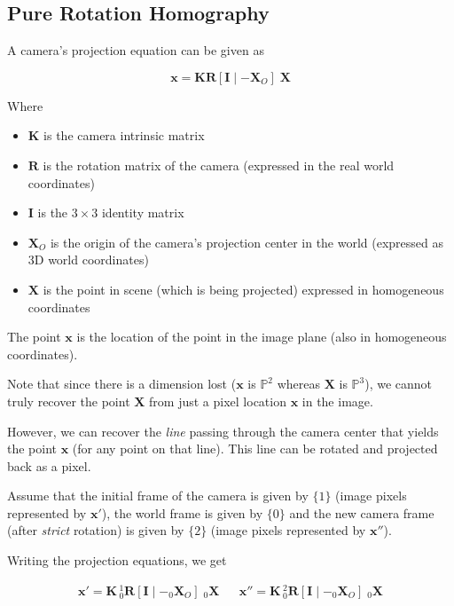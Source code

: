 
\subsection{Pure Rotation Homography}

A camera's projection equation can be given as

\begin{equation}
    \mathbf{x} = \mathbf{KR} [ \mathbf{I} \mid - \mathbf{X}_O ] \; \mathbf{X}
\end{equation}

Where

\begin{itemize}
    \item $\mathbf{K}$ is the camera intrinsic matrix
    \item $\mathbf{R}$ is the rotation matrix of the camera (expressed in the real world coordinates)
    \item $\mathbf{I}$ is the $3\times 3$ identity matrix
    \item $\mathbf{X}_O$ is the origin of the camera's projection center in the world (expressed as 3D world coordinates)
    \item $\mathbf{X}$ is the point in scene (which is being projected) expressed in homogeneous coordinates
\end{itemize}

The point $\mathbf{x}$ is the location of the point in the image plane (also in homogeneous coordinates).

Note that since there is a dimension lost ($\mathbf{x}$ is $\mathbb{P}^2$ whereas $\mathbf{X}$ is $\mathbb{P}^3$), we cannot truly recover the point $\mathbf{X}$ from just a pixel location $\mathbf{x}$ in the image. 

However, we can recover the \textit{line} passing through the camera center that yields the point $\mathbf{x}$ (for any point on that line). This line can be rotated and projected back as a pixel.

Assume that the initial frame of the camera is given by $\{1\}$ (image pixels represented by $\mathbf{x}'$), the world frame is given by $\{0\}$ and the new camera frame (after \textit{strict} rotation) is given by $\{2\}$ (image pixels represented by $\mathbf{x''}$).

Writing the projection equations, we get

\begin{align}
    \mathbf{x}' = \mathbf{K} \, ^1_0\mathbf{R} [ \mathbf{I} \mid - _0\mathbf{X}_O ] \; _0\mathbf{X}
    &&
    \mathbf{x}'' = \mathbf{K} \, ^2_0\mathbf{R} [ \mathbf{I} \mid - _0\mathbf{X}_O ] \; _0\mathbf{X}
    \label{eq:q2-rot-cam-proj-eq}
\end{align}

